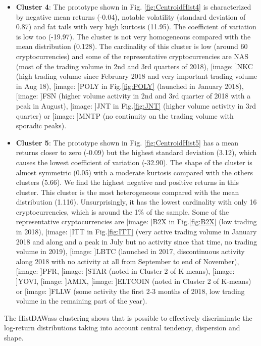 \documentclass{bmcart}
\def\texttt{[image: ]}
\begin{document}
\begin{itemize}
	\item \textbf{Cluster 4}: The prototype shown in Fig. \ref{fig:CentroidHist4} is characterized by negative mean returns (-0.04), notable  volatility (standard deviation of 0.87) and fat tails with very high kurtosis (11.95). The coefficient of variation is low too (-19.97). The cluster is not very homogeneous compared with the mean distribution (0.128). The cardinality of this cluster is low (around 60 cryptocurrencies) and some of the representative cryptocurrencies are NAS (most of the trading volume in 2nd and 3rd quarters of 2018), \texttt{NKC} (high trading volume since February 2018 and very important trading volume in Aug 18), \texttt{POLY} in Fig.\ref{fig:POLY} (launched in January 2018), \texttt{FSN} (higher volume activity in 2nd and 3rd quarter of 2018 with a peak in August), \texttt{JNT} in Fig.\ref{fig:JNT} (higher volume activity in 3rd quarter) or \texttt{MNTP} (no continuity on the trading volume with sporadic peaks).
	
	\item \textbf{Cluster 5}: The prototype shown in Fig. \ref{fig:CentroidHist5} has a mean returns closer to zero (-0.09) but the highest standard deviation (3.12), which causes the lowest coefficient of variation (-32.90). The shape of the cluster is almost symmetric (0.05) with a moderate kurtosis compared with the others clusters (5.66). We find the highest negative and positive returns in this cluster. This cluster is the most heterogeneous compared with the mean distribution (1.116). Unsurprisingly, it has the lowest cardinality  with only 16 cryptocurrencies, which is around the 1\% of the sample. Some of the representative cryptocurrencies are \texttt{B2X} in Fig.\ref{fig:B2X} (low trading in 2018), \texttt{ITT} in Fig.\ref{fig:ITT} (very active trading volume in January 2018 and along and a peak in July but no activity since that time, no trading volume in 2019), \texttt{LBTC} (launched in 2017, discontinuous activity along 2018 with no activity at all from September to end of November), \texttt{PFR}, \texttt{STAR} (noted in Cluster 2 of K-means), \texttt{YOVI}, \texttt{AMIX}, \texttt{ELTCOIN} (noted in Cluster 2 of K-means) or \texttt{FLLW} (some activity the first 2-3 months of 2018, low trading volume in the remaining part of the year).
	
\end{itemize}

The HistDAWass clustering shows that is possible to effectively discriminate the log-return distributions taking into account central tendency, dispersion and shape. 
\end{document}
